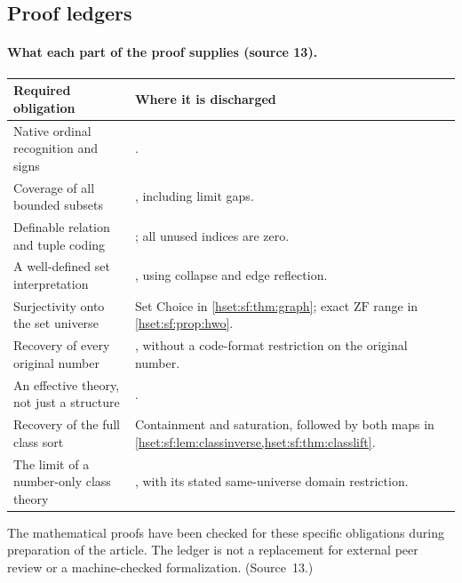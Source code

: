\documentclass[11pt,letterpaper]{article}
\theoremstyle{definition}
\theoremstyle{remark}
\newcommand{\ZF}{\mathrm{ZF}}
\begin{document}
\subsection{Proof ledgers}
\label{hset:sf:sub:ledger}

\paragraph{What each part of the proof supplies (source 13).}
\begin{center}
\small
\begin{tabularx}{\textwidth}{@{}P{0.31\textwidth}Y@{}}
\toprule
Required obligation & Where it is discharged\\
\midrule
Native ordinal recognition and signs & .\\
Coverage of all bounded subsets & , including limit gaps.\\
Definable relation and tuple coding & ; all unused indices are zero.\\
A well-defined set interpretation & , using collapse and edge reflection.\\
Surjectivity onto the set universe & Set Choice in \cref{hset:sf:thm:graph}; exact $\ZF$ range in \cref{hset:sf:prop:hwo}.\\
Recovery of every original number & , without a code-format restriction on the original number.\\
An effective theory, not just a structure & .\\
Recovery of the full class sort & Containment and saturation, followed by both maps in \cref{hset:sf:lem:classinverse,hset:sf:thm:classlift}.\\
The limit of a number-only class theory & , with its stated same-universe domain restriction.\\
\bottomrule
\end{tabularx}
\end{center}
The mathematical proofs have been checked for these specific obligations during
preparation of the article. The ledger is not a replacement for external peer review
or a machine-checked formalization. (Source~13.)
\end{document}
